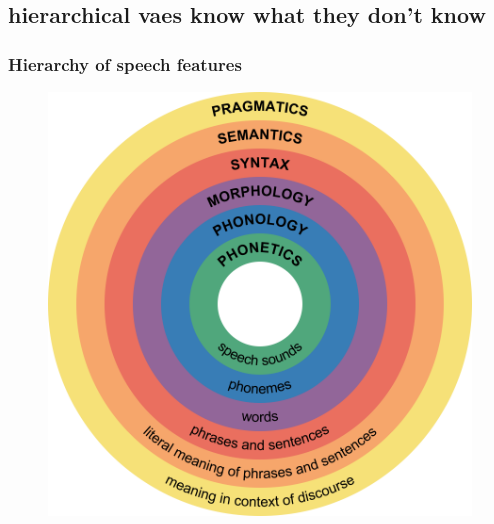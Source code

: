 \subsection[Hierarchical VAEs Know What They Don't Know]{hierarchical vaes know what they don't know}


\begin{frame}
    \frametitle{Hierarchy of speech features}
    \begin{figure}
        \centering
        \includegraphics[height=\textheight]{figures/Major_levels_of_linguistic_structure.png}
    \end{figure}
\end{frame}



